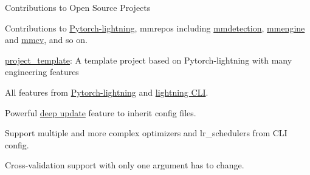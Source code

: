 
\begin{cventries}

	\cventry
	{} %
	{Contributions to Open Source Projects} %
	{\hfill} %
	{} %
	{
		\begin{cvitems} %
			\item{Contributions to \href{https://github.com/Lightning-AI/lightning}{\textcolor{link}{Pytorch-lightning}}, mmrepos including \href{https://github.com/open-mmlab/mmdetection}{\textcolor{link}{mmdetection}}, \href{https://github.com/open-mmlab/mmengine}{\textcolor{link}{mmengine}} and \href{https://github.com/open-mmlab/mmcv}{\textcolor{link}{mmcv}}, and so on.}
		\end{cvitems}
	}

	\cventry
	{} %
	{\href{https://github.com/shenmishajing/project_template}{\textcolor{link}{project\_template}}: A template project based on Pytorch-lightning with many engineering features} %
	{\hfill} %
	{} %
	{
		\vspace{-3.5mm}
		\begin{cvitems} %
			\item{All features from \href{https://github.com/Lightning-AI/lightning}{\textcolor{link}{Pytorch-lightning}} and \href{https://pytorch-lightning.readthedocs.io/en/stable/cli/lightning_cli.html}{\textcolor{link}{lightning CLI}}.}
			\item{Powerful \href{https://github.com/shenmishajing/lightning_template/blob/main/docs/configs/deep_update.md}{\textcolor{link}{deep update}} feature to inherit config files.}
			\item{Support multiple and more complex optimizers and lr\_schedulers from CLI config.}
			\item{Cross-validation support with only one argument has to change.}
		\end{cvitems}
	}

\end{cventries}
